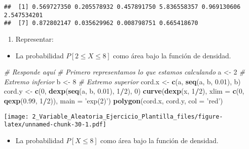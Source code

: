 \documentclass[
]{article}
\newenvironment{Shaded}{\begin{snugshade}}{\end{snugshade}}
\newcommand{\CommentTok}[1]{\textcolor[rgb]{0.56,0.35,0.01}{\textit{#1}}}
\newcommand{\DataTypeTok}[1]{\textcolor[rgb]{0.13,0.29,0.53}{#1}}
\newcommand{\DecValTok}[1]{\textcolor[rgb]{0.00,0.00,0.81}{#1}}
\newcommand{\FloatTok}[1]{\textcolor[rgb]{0.00,0.00,0.81}{#1}}
\newcommand{\KeywordTok}[1]{\textcolor[rgb]{0.13,0.29,0.53}{\textbf{#1}}}
\newcommand{\NormalTok}[1]{#1}
\newcommand{\OperatorTok}[1]{\textcolor[rgb]{0.81,0.36,0.00}{\textbf{#1}}}
\newcommand{\StringTok}[1]{\textcolor[rgb]{0.31,0.60,0.02}{#1}}
\providecommand{\tightlist}{%
  \setlength{\itemsep}{0pt}\setlength{\parskip}{0pt}}
\begin{document}
\begin{verbatim}
##  [1] 0.569727350 0.205578932 0.457891750 5.836558357 0.969130606 2.547534201
##  [7] 0.872802147 0.035629962 0.008798751 0.665418670
\end{verbatim}

\begin{enumerate}
\def\labelenumi{\arabic{enumi}.}
\setcounter{enumi}{3}
\tightlist
\item
  Representar:
\end{enumerate}

\begin{itemize}
\tightlist
\item
  La probabilidad \(P [2 \leq X \leq 8]\) como área bajo la función de
  densidad.
\end{itemize}

\begin{Shaded}
\begin{Highlighting}[]
\CommentTok{# Responde aquí}
\CommentTok{# Primero representamos lo que estamos calculando}
\NormalTok{a <-}\StringTok{ }\DecValTok{2} \CommentTok{# Extremo inferior}
\NormalTok{b <-}\StringTok{ }\DecValTok{8} \CommentTok{# Extremo superior}
\NormalTok{cord.x <-}\StringTok{ }\KeywordTok{c}\NormalTok{(a, }\KeywordTok{seq}\NormalTok{(a, b, }\FloatTok{0.01}\NormalTok{), b) }
\NormalTok{cord.y <-}\StringTok{ }\KeywordTok{c}\NormalTok{(}\DecValTok{0}\NormalTok{, }\KeywordTok{dexp}\NormalTok{(}\KeywordTok{seq}\NormalTok{(a, b, }\FloatTok{0.01}\NormalTok{), }\DecValTok{1}\OperatorTok{/}\DecValTok{2}\NormalTok{), }\DecValTok{0}\NormalTok{) }
\KeywordTok{curve}\NormalTok{(}\KeywordTok{dexp}\NormalTok{(x, }\DecValTok{1}\OperatorTok{/}\DecValTok{2}\NormalTok{), }\DataTypeTok{xlim =} \KeywordTok{c}\NormalTok{(}\DecValTok{0}\NormalTok{, }\KeywordTok{qexp}\NormalTok{(}\FloatTok{0.99}\NormalTok{, }\DecValTok{1}\OperatorTok{/}\DecValTok{2}\NormalTok{)), }\DataTypeTok{main =} \StringTok{'exp(2)'}\NormalTok{)}
\KeywordTok{polygon}\NormalTok{(cord.x, cord.y, }\DataTypeTok{col =} \StringTok{'red'}\NormalTok{)}
\end{Highlighting}
\end{Shaded}

\texttt{[image: 2\_Variable\_Aleatoria\_Ejercicio\_Plantilla\_files/figure-latex/unnamed-chunk-30-1.pdf]}

\begin{itemize}
\tightlist
\item
  La probabilidad \(P [X \leq 8]\) como área bajo la función de
  densidad.
\end{itemize}
\end{document}
